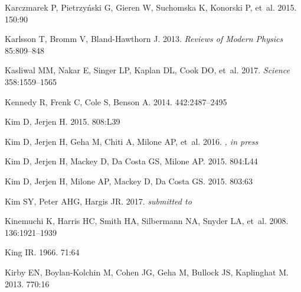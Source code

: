 \documentclass[a4paper]{ar-1col}
\begin{document}
\begin{thebibliography}{}
{Karczmarek} P, {Pietrzy{\'n}ski} G, {Gieren} W, {Suchomska} K, {Konorski} P,
  et~al. 2015.
\textit{\aj} 150:90

{Karlsson} T, {Bromm} V, {Bland-Hawthorn} J. 2013.
\textit{Reviews of Modern Physics} 85:809--848

{Kasliwal} MM, {Nakar} E, {Singer} LP, {Kaplan} DL, {Cook} DO, et~al. 2017.
\textit{Science} 358:1559--1565

{Kennedy} R, {Frenk} C, {Cole} S, {Benson} A. 2014.
\textit{\mnras} 442:2487--2495

{Kim} D, {Jerjen} H. 2015.
\textit{\apjl} 808:L39

{Kim} D, {Jerjen} H, {Geha} M, {Chiti} A, {Milone} AP, et~al. 2016.
\textit{\apjl, in press}

{Kim} D, {Jerjen} H, {Mackey} D, {Da Costa} GS, {Milone} AP.
  2015{}.
\textit{\apjl} 804:L44

{Kim} D, {Jerjen} H, {Milone} AP, {Mackey} D, {Da Costa} GS.
  2015{}.
\textit{\apj} 803:63

{Kim} SY, {Peter} AHG, {Hargis} JR. 2017.
\textit{submitted to \prl}

{Kinemuchi} K, {Harris} HC, {Smith} HA, {Silbermann} NA, {Snyder} LA, et~al.
  2008.
\textit{\aj} 136:1921--1939

{King} IR. 1966.
\textit{\aj} 71:64

{Kirby} EN, {Boylan-Kolchin} M, {Cohen} JG, {Geha} M, {Bullock} JS,
  {Kaplinghat} M. 2013{}.
\textit{\apj} 770:16


\end{thebibliography}
\end{document}
